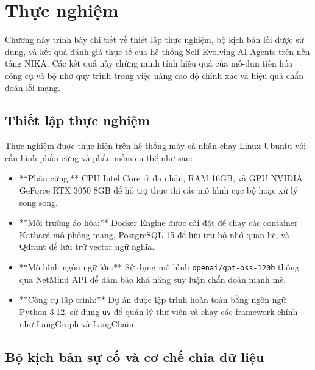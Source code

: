 \chapter{Thực nghiệm}
\label{chap:experiments}

Chương này trình bày chi tiết về thiết lập thực nghiệm, bộ kịch bản lỗi được sử dụng, và kết quả đánh giá thực tế của hệ thống Self-Evolving AI Agents trên nền tảng NIKA. Các kết quả này chứng minh tính hiệu quả của mô-đun tiến hóa công cụ và bộ nhớ quy trình trong việc nâng cao độ chính xác và hiệu quả chẩn đoán lỗi mạng.

\section{Thiết lập thực nghiệm}
\label{sec:experiment_setup}

Thực nghiệm được thực hiện trên hệ thống máy cá nhân chạy Linux Ubuntu với cấu hình phần cứng và phần mềm cụ thể như sau:
\begin{itemize}
    \item **Phần cứng:** CPU Intel Core i7 đa nhân, RAM 16GB, và GPU NVIDIA GeForce RTX 3050 8GB để hỗ trợ thực thi các mô hình cục bộ hoặc xử lý song song.
    \item **Môi trường ảo hóa:** Docker Engine được cài đặt để chạy các container Kathará mô phỏng mạng, PostgreSQL 15 để lưu trữ bộ nhớ quan hệ, và Qdrant để lưu trữ vector ngữ nghĩa.
    \item **Mô hình ngôn ngữ lớn:** Sử dụng mô hình \texttt{openai/gpt-oss-120b} thông qua NetMind API để đảm bảo khả năng suy luận chẩn đoán mạnh mẽ.
    \item **Công cụ lập trình:** Dự án được lập trình hoàn toàn bằng ngôn ngữ Python 3.12, sử dụng \texttt{uv} để quản lý thư viện và chạy các framework chính như LangGraph và LangChain.
\end{itemize}

\section{Bộ kịch bản sự cố và cơ chế chia dữ liệu}
\label{sec:benchmark_scenarios}


